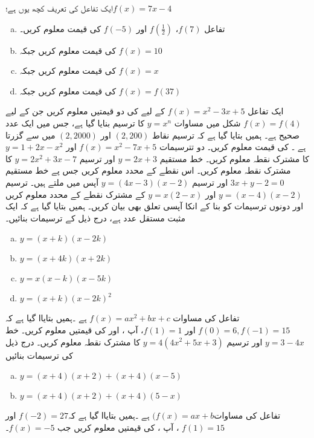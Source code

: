 
ایک تفاعل کی تعریف کچھ یوں ہے؛\(f(x)=7x-4\)
\begin{enumerate}[a.]
\item  
تفاعل \( f(7)  \)، \( f(\frac{1}{2}) \) اور \(  f(-5) \) کی قیمت معلوم کریں۔
\item  
{} کی قیمت معلوم کریں جبکہ \( f(x)=10 \)
\item  
{} کی قیمت معلوم کریں جبکہ \( f(x)=x \)
\item  
{} کی قیمت معلوم کریں جبکہ \( f(x)=f(37)\)
 \end{enumerate}
ایک تفاعل \( f(x)=x^{2}-3x+5 \) کے لیے  کی دو قیمتیں معلوم کریں جن کے لیے \(      f(x)=f(4)\)
شکل میں مساوات \(  y=x^{n}\) کا ترسیم بنایا گیا ہے، جس میں  ایک عدد صحیح ہے۔ ہمیں بتایا گیا ہے کہ ترسیم نقاط \(  (2,200)\) اور \(  (2,2000)\) میں سے گزرتا ہے ۔  کی قیمت معلوم کریں۔
دو تترسیمات \( f(x)=x^{2}-7x+5\) اور \(      y=1+2x-x^{2}\) کا مشترک نقطہ معلوم کریں۔
خط مستقیم \( y=2x+3   \) اور  ترسیم \(   y=2x^{2}+3x-7\) کا مشترک نقطہ معلوم کریں۔
اس نقطے کے محدد معلوم کریں جس پے خط مستقیم \(3x+y-2=0 \) اور ترسیم \(      y=(4x-3)(x-2)\) آپس میں ملتے ہیں۔
ترسیم \(y=(x-4)(x-2) \) اور \(      y=x(2-x)\) کے مشترک نقطے کے محدد معلوم کریں اور دونوں ترسیمات کو بنا کے انکا آپسی تعلق بھی بیان کریں۔
ہمیں بتایا گیا ہے کہ  ایک مثبت مستقل عدد ہے، درج ذیل کے ترسیمات بنائیں۔
\begin{multicols}{2}
\begin{enumerate}[a.]
\item \( y=(x+k)(x-2k) \)
\item \( y=(x+4k)(x+2k) \)
\item \(y=x(x-k)(x-5k)  \)
\item \( y=(x+k)(x-2k)^{2} \)
\end{enumerate}
\end{multicols}
تفاعل  کی مساوات \(f(x)=ax^{2}+bx+c \) ہے ۔ہمیں بتایاا گیا ہے کہ \( f(0)=6,f(-1)=15\) اور \(   f(1)=1\)،
آپ ،   اور   کی قیمتیں معلوم کریں۔
خط \(y=3-4x \)  اور ترسیم \(      y=4(4x^{2}+5x+3)\) کا مشترک نقطہ معلوم کریں۔
درج ذیل کی ترسیمات بنائیں
\begin{enumerate}[a.]
\item \(y=(x+4)(x+2)+(x+4)(x-5)  \)
\item \( y=(x+4)(x+2)+(x+4)(5-x) \)
\end{enumerate}
تفاعل  کی مساوات\((f(x)=ax+b \)  ہے ۔ہمیں بتایاا گیا ہے کہ\(f(-2)=27 \) اور \( f(1)=15  \) ،
آپ ،  کی قیمتیں معلوم کریں جب \( f(x)=-5\)۔

